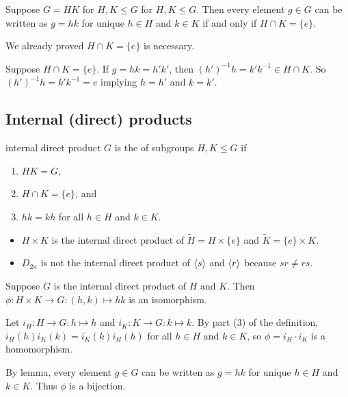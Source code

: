 \documentclass[12pt,letterpaper]{report}
\begin{document}
\begin{lem}{}{}
  Suppose $G = HK$ for $H, K \leq G$ for $H, K \leq G$.
  Then every element $g \in G$ can be written as $g = hk$ for unique $h \in H$ and $k \in K$ if and
  only if $H \cap K = \{e\}$.
\end{lem}

\begin{thmproof}
  We already proved $H \cap K = \{e\}$ is necessary.

  Suppose $H \cap K = \{e\}$.
  If $g = hk = h'k'$, then $(h')^{-1}h = k'k^{-1} \in H \cap K$.
  So $(h')^{-1}h = k'k^{-1} = e$ implying $h = h'$ and $k = k'$.
\end{thmproof}

\pagebreak
\subsection{Internal (direct) products}

\begin{defn}{internal direct product}{}
  $G$ is the  of subgroups $H, K \leq G$ if
  \begin{enumerate}
    \item $HK = G$,
    \item $H \cap K = \{e\}$, and
    \item $hk = kh$ for all $h \in H$ and $k \in K$.
  \end{enumerate}
\end{defn}

\begin{ex}
  \begin{itemize}
    \item $H \times K$ is the internal direct product of $\tilde{H} = H \times \{e\}$ and
      $\tilde{K} = \{e\} \times K$.
    \item $D_{2n}$ is not the internal direct product of $\langle s\rangle$ and $\langle r\rangle$ because
      $sr \neq rs$.
  \end{itemize}
\end{ex}

\begin{thm}{}{}
  Suppose $G$ is the internal direct product of $H$ and $K$.
  Then $\phi \colon H \times K \to G : (h, k) \mapsto hk$ is an isomorphism.
\end{thm}

\begin{thmproof}
  Let $i_H \colon H \to G : h \mapsto h$ and $i_K \colon K \to G : k \mapsto k$.
  By part (3) of the definition, $i_H(h) i_K(k) = i_K(k) i_H(h)$ for all $h \in H$ and $k \in K$, so
  $\phi = i_H \cdot i_K$ is a homomorphism.

  By lemma, every element $g \in G$ can be written as $g = hk$ for unique $h \in H$ and $k \in K$.
  Thus $\phi$ is a bijection.
\end{thmproof}
\end{document}
